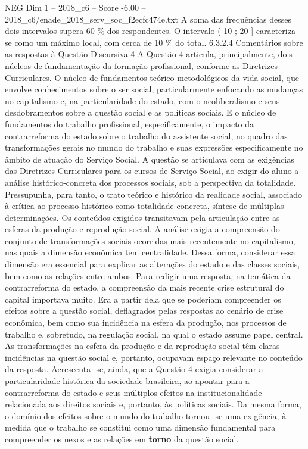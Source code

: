 \begin{textsample}{NEG Dim 1 – 2018\_c6 – Score -6.00 – 2018\_c6/enade\_2018\_serv\_soc\_f2ecfc474e.txt}
A soma das frequências desses dois intervalos supera 60 \% dos respondentes.
O intervalo ( 10 ; 20 ] caracteriza -se como um máximo local, com cerca de 10 \% do total. 6.3.2.4 Comentários sobre as respostas à Questão Discursiva 4 A Questão 4 articula, principalmente, dois núcleos de fundamentação da formação profissional, conforme as Diretrizes Curriculares.
O núcleo de fundamentos teórico-metodológicos da vida social, que envolve conhecimentos sobre o ser social, particularmente enfocando as mudanças no capitalismo e, na particularidade do estado, com o neoliberalismo e seus desdobramentos sobre a questão social e as políticas sociais.
E o núcleo de fundamentos do trabalho profissional, especificamente, o impacto da contrarreforma do estado sobre o trabalho do assistente social, no quadro das transformações gerais no mundo do trabalho e suas expressões especificamente no âmbito de atuação do Serviço Social.
A questão se articulava com as exigências das Diretrizes Curriculares para os cursos de Serviço Social, ao exigir do aluno a análise histórico-concreta dos processos sociais, sob a perspectiva da totalidade.
Pressupunha, para tanto, o trato teórico e histórico da realidade social, associado à crítica ao processo histórico como totalidade concreta, síntese de múltiplas determinações.
Os conteúdos exigidos transitavam pela articulação entre as esferas da produção e reprodução social.
A análise exigia a compreensão do conjunto de transformações sociais ocorridas mais recentemente no capitalismo, nas quais a dimensão econômica tem centralidade.
Dessa forma, considerar essa dimensão era essencial para explicar as alterações do estado e das classes sociais, bem como as relações entre ambos.
Para redigir uma resposta, na temática da contrarreforma do estado, a compreensão da mais recente crise estrutural do capital importava muito.
Era a partir dela que se poderiam compreender os efeitos sobre a questão social, deflagrados pelas respostas ao cenário de crise econômica, bem como sua incidência na esfera da produção, nos processos de trabalho e, sobretudo, na regulação social, na qual o estado assume papel central.
As transformações na esfera da produção e da reprodução social têm claras incidências na questão social e, portanto, ocupavam espaço relevante no conteúdo da resposta.
Acrescenta -se, ainda, que a Questão 4 exigia considerar a particularidade histórica da sociedade brasileira, ao apontar para a contrarreforma do estado e seus múltiplos efeitos na institucionalidade relacionada aos direitos sociais e, portanto, às políticas sociais.
Da mesma forma, o domínio dos efeitos sobre o mundo do trabalho tornou -se uma exigência, à medida que o trabalho se constitui como uma dimensão fundamental para compreender os nexos e as relações em \textbf{torno} da questão social.

\end{textsample}
